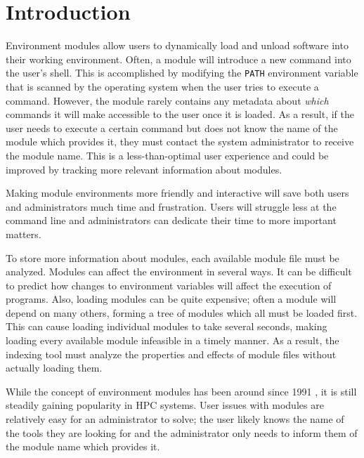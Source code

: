 \documentclass[manuscript,screen]{acmart}
\begin{document}
\section{Introduction}
Environment modules allow users to dynamically load and unload software into their working environment.
Often, a module will introduce a new command into the user’s shell. This is accomplished by modifying
the \texttt{PATH} environment variable that is scanned by the operating system when the user tries to execute a
command. However, the module rarely contains any metadata about \textit{which} commands it will make accessible
to the user once it is loaded. As a result, if the user needs to execute a certain command but does not
know the name of the module which provides it, they must contact the system administrator to receive the
module name. This is a less-than-optimal user experience and could be improved by tracking more relevant
information about modules.

\par

Making module environments more friendly and interactive will save both users and administrators much
time and frustration. Users will struggle less at the command line and administrators can dedicate their
time to more important matters.

\par

To store more information about modules, each available module file must be analyzed. Modules can affect
the environment in several ways. It can be difficult to predict how changes to environment variables will
affect the execution of programs. Also, loading modules can be quite expensive; often a module will depend
on many others, forming a tree of modules which all must be loaded first. This can cause loading individual
modules to take several seconds, making loading every available module infeasible in a timely manner.
As a result, the indexing tool must analyze the properties and effects of module files without actually loading
them.

\par

While the concept of environment modules has been around since 1991 \cite{TclPaper}, it is still steadily gaining
popularity in HPC systems. User issues with modules are relatively easy for an administrator to solve; the
user likely knows the name of the tools they are looking for and the administrator only needs to inform
them of the module name which provides it.
\end{document}

